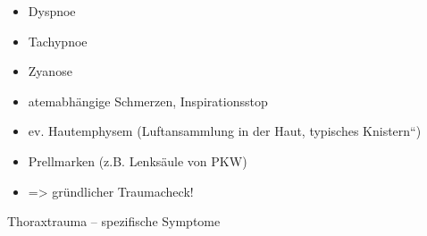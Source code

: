 \documentclass{article}
\begin{document}
\begin{itemize}
\item {\mdseries
Dyspnoe}

\end{itemize}
\begin{itemize}
\item {\mdseries
Tachypnoe}

\item {\mdseries
Zyanose}

\end{itemize}
\begin{itemize}
\item {\mdseries
atemabh\"angige  Schmerzen,  Inspirationsstop}

\item {\mdseries
ev. Hautemphysem (Luftansammlung in der Haut, typisches
{\quotedblbase}Knistern{\textquotedblleft})}

\item {\mdseries
Prellmarken (z.B. Lenks\"aule von PKW) }

\end{itemize}
\begin{itemize}
\item {\mdseries
={\textgreater} gr\"undlicher Traumacheck!}

\end{itemize}
{\mdseries\color{black}
Thoraxtrauma -- spezifische  Symptome}
\end{document}
